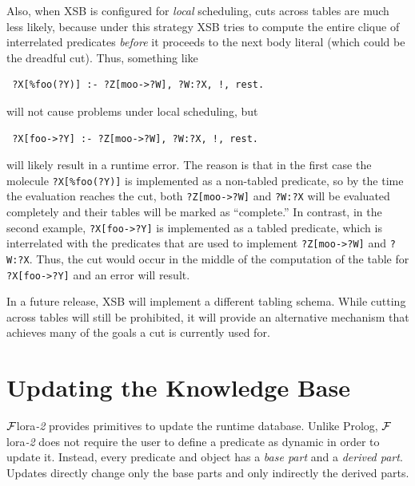 \documentclass[11pt]{article}
\newcommand{\FLORA}{{\mbox{\sc ${\cal F}${lora}\rm\emph{-2}}}\xspace}
\begin{document}
Also, when XSB is configured for \emph{local} scheduling, cuts across
tables are much less likely, because under this strategy XSB tries to
compute the entire clique of interrelated predicates \emph{before} it
proceeds to the next body literal (which could be the dreadful cut).
Thus, something like
\begin{verbatim}
 ?X[%foo(?Y)] :- ?Z[moo->?W], ?W:?X, !, rest.  
\end{verbatim}
will not cause problems under local scheduling, but
\begin{verbatim}
 ?X[foo->?Y] :- ?Z[moo->?W], ?W:?X, !, rest.  
\end{verbatim}
will likely result in a runtime error. The reason is that in the first case
the molecule \verb|?X[%foo(?Y)]| is implemented as a non-tabled predicate, so
by the time the evaluation reaches the cut, both \verb|?Z[moo->?W]| and 
{\tt ?W:?X} will be evaluated completely and their tables will be marked as
``complete.'' In contrast, in the second example, \verb|?X[foo->?Y]| is
implemented as a tabled predicate, which is interrelated with the
predicates that are used to implement \verb|?Z[moo->?W]| and 
{\tt ?W:?X}. Thus, the cut would occur in the middle of the computation of
the table for \verb|?X[foo->?Y]| and an error will result.

In a future release, XSB will implement a different tabling schema. While
cutting across tables will still be prohibited, it will provide an
alternative mechanism that achieves many of the goals a cut is currently  used for.


\section{Updating the Knowledge Base}\label{sec-updates}


%
\FLORA provides primitives to update the runtime database. Unlike Prolog,
\FLORA does not require the user to define a predicate as dynamic in order
to update it. Instead, every predicate and object
has a \emph{base part} and a \emph{derived part}.  Updates directly change
only the base parts and only indirectly the derived parts.
\end{document}
